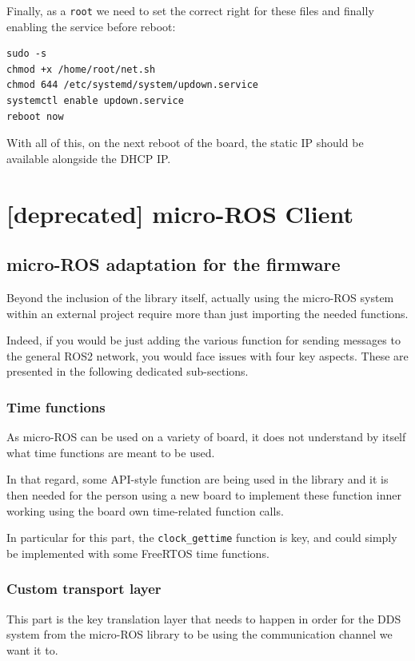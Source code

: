 \documentclass[10pt]{article}
\begin{document}
Finally, as a \texttt{root} we need to set the correct right for these files and finally enabling the service before reboot:
\begin{verbatim}
sudo -s
chmod +x /home/root/net.sh
chmod 644 /etc/systemd/system/updown.service
systemctl enable updown.service
reboot now
\end{verbatim}

With all of this, on the next reboot of the board, the static IP should be available alongside the DHCP IP.

\section{[deprecated] micro-ROS Client}
\label{sec:org391c02d}
\subsection{micro-ROS adaptation for the firmware}
\label{sec:orgdb52af5}
Beyond the inclusion of the library itself, actually using the micro-ROS system
within an external project require more than just importing the needed
functions.

Indeed, if you would be just adding the various function for sending messages to
the general ROS2 network, you would face issues with four key aspects.
These are presented in the following dedicated sub-sections.

\subsubsection{Time functions}
\label{sec:orgd04766e}
As micro-ROS can be used on a variety of board, it does not understand by itself
what time functions are meant to be used.

In that regard, some API-style function are being
used in the library and it is then needed for the person using a new board
to implement these function inner working using the board own time-related
function calls.

In particular for this part, the \texttt{clock\_gettime} function is key, and could
simply be implemented with some FreeRTOS time functions.

\subsubsection{Custom transport layer}
\label{sec:org4ac20e3}
This part is the key translation layer that needs to happen in order for the
DDS system from the micro-ROS library to be using the communication channel we
want it to.
\end{document}
